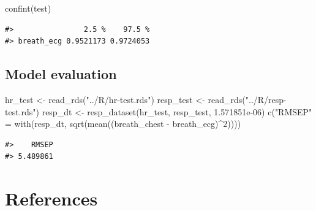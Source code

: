 \documentclass[
]{article}
\newenvironment{Shaded}{\begin{snugshade}}{\end{snugshade}}
\newcommand{\DecValTok}[1]{\textcolor[rgb]{0.00,0.00,0.81}{#1}}
\newcommand{\FloatTok}[1]{\textcolor[rgb]{0.00,0.00,0.81}{#1}}
\newcommand{\FunctionTok}[1]{\textcolor[rgb]{0.00,0.00,0.00}{#1}}
\newcommand{\NormalTok}[1]{#1}
\newcommand{\OtherTok}[1]{\textcolor[rgb]{0.56,0.35,0.01}{#1}}
\newcommand{\SpecialCharTok}[1]{\textcolor[rgb]{0.00,0.00,0.00}{#1}}
\newcommand{\StringTok}[1]{\textcolor[rgb]{0.31,0.60,0.02}{#1}}
\begin{document}
\begin{Shaded}
\begin{Highlighting}[]
\FunctionTok{confint}\NormalTok{(test)}
\end{Highlighting}
\end{Shaded}

\begin{verbatim}
#>                2.5 %    97.5 %
#> breath_ecg 0.9521173 0.9724053
\end{verbatim}

\hypertarget{model-evaluation-1}{%
\subsection{Model evaluation}\label{model-evaluation-1}}

\begin{Shaded}
\begin{Highlighting}[]
\NormalTok{hr\_test }\OtherTok{\textless{}{-}} \FunctionTok{read\_rds}\NormalTok{(}\StringTok{"../R/hr{-}test.rds"}\NormalTok{)}
\NormalTok{resp\_test }\OtherTok{\textless{}{-}} \FunctionTok{read\_rds}\NormalTok{(}\StringTok{"../R/resp{-}test.rds"}\NormalTok{)}
\NormalTok{resp\_dt }\OtherTok{\textless{}{-}} \FunctionTok{resp\_dataset}\NormalTok{(hr\_test, resp\_test, }\FloatTok{1.571851e{-}06}\NormalTok{)}
\FunctionTok{c}\NormalTok{(}\StringTok{"RMSEP"} \OtherTok{=} \FunctionTok{with}\NormalTok{(resp\_dt, }\FunctionTok{sqrt}\NormalTok{(}\FunctionTok{mean}\NormalTok{((breath\_chest }\SpecialCharTok{{-}}\NormalTok{ breath\_ecg)}\SpecialCharTok{\^{}}\DecValTok{2}\NormalTok{))))}
\end{Highlighting}
\end{Shaded}

\begin{verbatim}
#>    RMSEP 
#> 5.489861
\end{verbatim}

\newpage

\hypertarget{references}{%
\section*{References}\label{references}}
\end{document}
